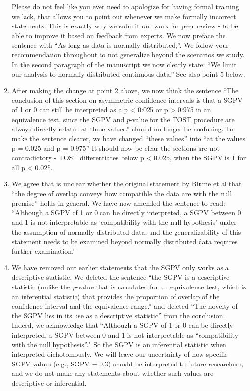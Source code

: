 \documentclass[man]{apa6}
\begin{document}
\begin{enumerate}
  Please do not feel like you ever need to apologize for having formal training we lack, that allows you to point out whenever we make formally incorrect statements. This is exactly why we submit our work for peer review - to be able to improve it based on feedback from experts. We now preface the sentence with \enquote{As long as data is normally distributed,}. We follow your recommendation throughout to not generalize beyond the scenarios we study. In the second paragraph of the manuscript we now clearly state: \enquote{We limit our analysis to normally distributed continuous data.} See also point 5 below.
\item
  After making the change at point 2 above, we now think the sentence \enquote{The conclusion of this section on asymmetric confidence intervals is that a SGPV of 1 or 0 can still be interpreted as a p \textless{} 0:025 or p \textgreater{} 0:975 in an equivalence test, since the SGPV and \emph{p}-value for the TOST
  procedure are always directly related at these values.} should no longer be confusing. To make the sentence clearer, we have changed \enquote{these values} into \enquote{at the values p = 0.025 and p = 0.975} It should now be clear the sections are not contradictory - TOST differentiates below p \textless{} 0.025, when the SGPV is 1 for all p \textless{} 0.025.
\item
  We agree that is unclear whether the original statement by Blume et al that \enquote{the degree of overlap conveys how compatible the data are with the null premise} holds in general. We have now amended the sentence to read: \enquote{Although a SGPV of 1 or 0 can be directly interpreted, a SGPV between 0 and 1 is not interpretable as \enquote{compatibility with the null hypothesis} under the assumption of normally distributed data, and the generalizability of this statement needs to be examined beyond normally distributed data requires further examination.}
\item
  We have removed our earlier statements that the SGPV only works as a descriptive statistic. We deleted the sentence \enquote{the SGPV is a descriptive statistic (unlike the \emph{p}-value that is calculated for an equivalence test, which is an inferential statistic) that provides the proportion of overlap of the confidence interval and the equivalence range.} and deleted \enquote{The novelty of the SGPV lies in its use as a descriptive statistic} from the conclusion. Indeed, we acknowledge that \enquote{Although a SGPV of 1 or 0 can be directly interpreted, a SGPV between 0 and 1 is not interpretable as ``compatibility with the null hypothesis}." So the SGPV is an inferential statistic when interpreted dichotomously. We will leave our uncertainty of how specific SGPV values (e.g., SGPV = 0.3) should be interpreted to future researchers, and we do not make any statements about whether such values are descriptive or inferential.

\end{enumerate}
\end{document}
